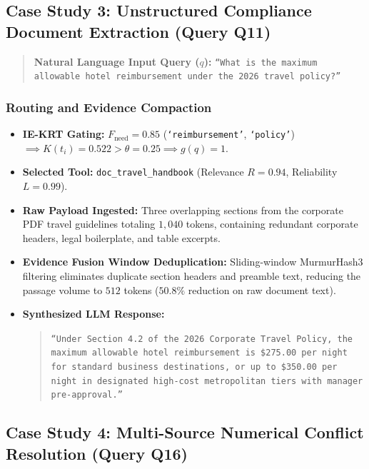\subsection{Case Study 3: Unstructured Compliance Document Extraction (Query Q11)}
\label{subsec:trace_q11}

\begin{quote}
\textbf{Natural Language Input Query ($q$):}  
\texttt{``What is the maximum allowable hotel reimbursement under the 2026 travel policy?''}
\end{quote}

\subsubsection{Routing and Evidence Compaction}
\begin{itemize}
    \item \textbf{IE-KRT Gating:} $F_{\text{need}} = 0.85$ (\texttt{`reimbursement'}, \texttt{`policy'}) $\implies K(t_i) = 0.522 > \theta = 0.25 \implies g(q) = 1$.
    \item \textbf{Selected Tool:} \texttt{doc\_travel\_handbook} (Relevance $R=0.94$, Reliability $L=0.99$).
    \item \textbf{Raw Payload Ingested:} Three overlapping sections from the corporate PDF travel guidelines totaling $1,040$ tokens, containing redundant corporate headers, legal boilerplate, and table excerpts.
    \item \textbf{Evidence Fusion Window Deduplication:} Sliding-window MurmurHash3 filtering eliminates duplicate section headers and preamble text, reducing the passage volume to $512$ tokens ($50.8\%$ reduction on raw document text).
    \item \textbf{Synthesized LLM Response:}
    \begin{quote}
        \texttt{``Under Section 4.2 of the 2026 Corporate Travel Policy, the maximum allowable hotel reimbursement is \$275.00 per night for standard business destinations, or up to \$350.00 per night in designated high-cost metropolitan tiers with manager pre-approval.''}
    \end{quote}
\end{itemize}

\subsection{Case Study 4: Multi-Source Numerical Conflict Resolution (Query Q16)}
\label{subsec:trace_q16}

